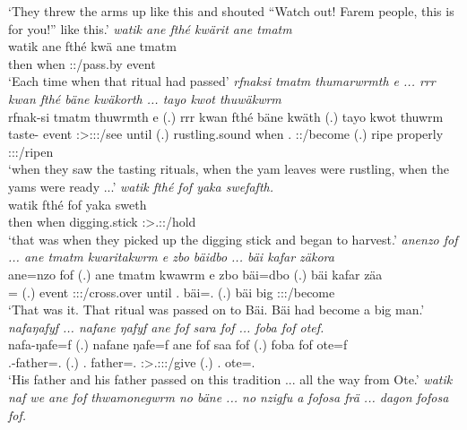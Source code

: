 \begin{exe}
	\trans `They threw the arms up like this and shouted ``Watch out! Farem people, this is for you!'' like this.'
	\emph{watik ane fthé kwärit ane tmatm}\\
	\gll watik ane fthé kwä ane tmatm\\ 
	then {\Dem} when \Stsg:\Sbj:\Iter/pass.by {\Dem} event\\
	\trans `Each time when that ritual had passed'
	\emph{rfnaksi tmatm thumarwrmth e ... rrr kwan fthé bäne kwäkorth ... tayo kwot thuwäkwrm}\\
	\gll rfnak-si tmatm thuwrmth e (.) {rrr kwan} fthé bäne kwäth (.) tayo kwot thuwrm\\ 
	taste-{\Nmlz} event \Stpl:\Sbj>\Stpl:\Obj:\Pst:\Dur/see until (.) rustling.sound when \Recog.{\Abs} \Stpl:\Sbj:\Iter/become (.) ripe properly \Stpl:\Sbj:\Pst:\Dur/ripen\\
	\trans `when they saw the tasting rituals, when the yam leaves were rustling, when the yams were ready ...'
	\emph{watik fthé fof yaka swefafth.}\\
	\gll watik fthé fof yaka sweth\\ 
	then when {\Emph} digging.stick \Stpl:\Sbj>\Tsg.\Masc:\Obj:\Iter/hold\\
	\trans `that was when they picked up the digging stick and began to harvest.'
	\emph{anenzo fof ... ane tmatm kwaritakwrm e zbo bäidbo ... bäi kafar zäkora}\\
	\gll ane=nzo fof (.) ane tmatm kwawrm e zbo bäi=dbo (.) bäi kafar zäa\\ 
	\Dem={\Only} {\Emph} (.) {\Dem} event \Sg:\Sbj:\Pst:\Dur/cross.over until \Prox.{\All} bäi=\All.{\Sg} (.) bäi big \Sg:\Sbj:\Pst:\Pfv/become\\
	\trans `That was it. That ritual was passed on to Bäi. Bäi had become a big man.'
	\emph{nafaŋafyf ... nafane ŋafyf ane fof sara fof ... foba fof otef.}\\
	\gll nafa-ŋafe=f (.) nafane ŋafe=f ane fof saa fof (.) foba fof ote=f\\ 
	\Third.\Poss-father=\Erg.{\Sg} (.) \Tsg.{\Poss} father=\Erg.{\Sg} {\Dem} {\Emph} \Sg:\Sbj>\Tsg.\Masc:\Io:\Pst:\Pfv/give {\Emph} (.) \Dist.{\Abl} {\Emph} ote=\Erg.\Sg\\
	\trans `His father and his father passed on this tradition ... all the way from Ote.'
\largerpage
{} 
	\emph{watik naf we ane fof thwamonegwrm no bäne ... no nzigfu a fofosa frä ... dagon fofosa fof.}\\

\end{exe}
